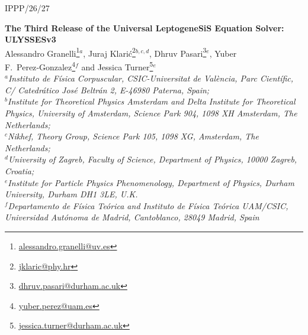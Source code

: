 \documentclass[12pt, a4paper]{article}
\begin{document}
\vspace*{-15mm}
\begin{flushright}
IPPP/26/27
\end{flushright}
\vspace*{0.7cm}


\begin{center}
{\bf \large The Third Release of the Universal LeptogeneSiS Equation Solver: ULYSSESv3}\\
[5mm]
 \renewcommand*{\thefootnote}{\fnsymbol{footnote}}
Alessandro Granelli\footnote{\href{mailto:alessandro.granelli@uv.es}{alessandro.granelli@uv.es}}$^{a}$,
Juraj Klari\'c\footnote{\href{mailto:jklaric@nikhef.nl}{jklaric@phy.hr}}$^{b,c,d}$,
Dhruv Pasari\footnote{\href{mailto:dhruv.pasari@durham.ac.uk}{dhruv.pasari@durham.ac.uk}}$^{e}$,
Yuber F.\ Perez‑Gonzalez\footnote{\href{mailto:yuber.perez@uam.es}{yuber.perez@uam.es}}$^{f}$ and 
Jessica Turner\footnote{\href{mailto:jessica.turner@durham.ac.uk}{jessica.turner@durham.ac.uk}}$^{e}$\\
\vspace{2mm}
$^{a}${\it Instituto de Física Corpuscular, CSIC-Universitat de València, Parc Científic,\\ C/ Catedrático José Beltrán 2, E-46980 Paterna, Spain;}\\
$^{b}${\it Institute for Theoretical Physics Amsterdam and Delta Institute for Theoretical Physics,
University of Amsterdam, Science Park 904, 1098 XH Amsterdam, The Netherlands;}\\
$^{c}${\it Nikhef, Theory Group, Science Park 105, 1098 XG, Amsterdam, The Netherlands;}\\
$^{d}${\it University of Zagreb, Faculty of Science, Department of Physics, 10000 Zagreb, Croatia;}\\
$^{e}${\it Institute for Particle Physics Phenomenology, Department of Physics, Durham University, Durham DH1 3LE, U.K.}\\
$^{f}${\it Departamento de Física Teórica and Instituto de Física Teórica UAM/CSIC,\\ Universidad Autónoma de Madrid, Cantoblanco, 28049 Madrid, Spain}

\end{center}
\end{document}
